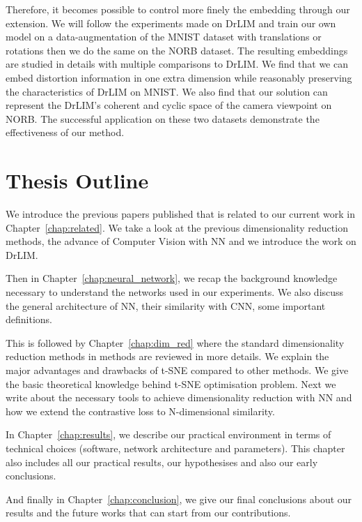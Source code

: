 \documentclass[a4paper,12pt]{report}
\begin{document}
Therefore, it becomes possible to control more finely the embedding through our extension.
We will follow the experiments made on DrLIM and train our own model on a data-augmentation of the MNIST dataset\cite{lecun1998mnist} with translations or rotations then we do the same on the NORB dataset\cite{lecun2004learning}.
The resulting embeddings are studied in details with multiple comparisons to DrLIM.
We find that we can embed distortion information in one extra dimension while reasonably preserving the characteristics of DrLIM on MNIST.
We also find that our solution can represent the DrLIM's coherent and cyclic space of the camera viewpoint on NORB.
The successful application on these two datasets demonstrate the effectiveness of our method.

\section{Thesis Outline}
We introduce the previous papers published that is related to our current work in Chapter~\ref{chap:related}.
We take a look at the previous dimensionality reduction methods, the advance of Computer Vision with NN and we introduce the work on DrLIM.

Then in Chapter~\ref{chap:neural_network}, we recap the background knowledge necessary to understand the networks used in our experiments.
We also discuss the general architecture of NN, their similarity with CNN, some important definitions.

This is followed by Chapter~\ref{chap:dim_red} where the standard dimensionality reduction methods in methods are reviewed in more details.
We explain the major advantages and drawbacks of t-SNE compared to other methods.
We give the basic theoretical knowledge behind t-SNE optimisation problem.
Next we write about the necessary tools to achieve dimensionality reduction with NN and how we extend the contrastive loss to N-dimensional similarity.

In Chapter~\ref{chap:results}, we describe our practical environment in terms of technical choices (software, network architecture and parameters).
This chapter also includes all our practical results, our hypothesises and also our early conclusions.

And finally in Chapter~\ref{chap:conclusion}, we give our final conclusions about our results and the future works that can start from our contributions.


\end{document}
